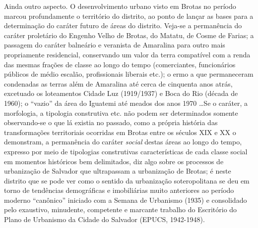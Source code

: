 Ainda outro aspecto. O desenvolvimento urbano visto em Brotas no período marcou profundamente o território do distrito, ao ponto de lançar as bases para a determinação do caráter futuro de áreas do distrito. Veja-se a permanência do caráter proletário do Engenho Velho de Brotas, do Matatu, de Cosme de Farias; a passagem do caráter balneário e veranista de Amaralina para outro mais propriamente residencial, conservando um valor da terra compatível com a renda das mesmas frações de classe ao longo do tempo (comerciantes, funcionários públicos de médio escalão, profissionais liberais etc.); o ermo a que permaneceram condenadas as terras além de Amaralina até cerca de cinquenta anos atrás, excetuado os loteamentos Cidade Luz (1919/1937) e Boca do Rio (década de 1960); o ``vazio'' da área do Iguatemi até meados dos anos 1970 \dots Se o caráter, a morfologia, a tipologia construtiva etc. não podem ser determinados somente observando-se o que lá existia no passado, como a própria história das transformações territoriais ocorridas em Brotas entre os séculos XIX e XX o demonstram, a permanência do caráter \textit{social} destas áreas ao longo do tempo, expresso por meio de tipologias construtivas características de cada classe social em momentos históricos bem delimitados, diz algo sobre os processos de urbanização de Salvador que ultrapassam a urbanização de Brotas; é neste distrito que se pode ver como o sentido da urbanização soteropolitana se deu em torno de tendências demográficas e imobiliárias muito anteriores ao período moderno ``canônico'' iniciado com a Semana de Urbanismo (1935) e consolidado pelo exaustivo, minudente, competente e marcante trabalho do Escritório do Plano de Urbanismo da Cidade do Salvador (EPUCS, 1942-1948).
